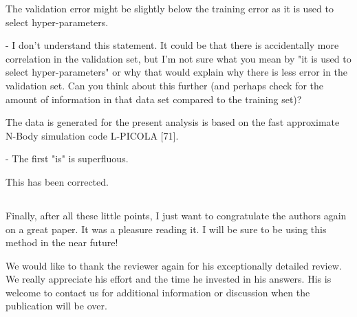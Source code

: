 \documentclass[12pt,a4paper]{article}
\newcommand{\nati}[1]{{\color[rgb]{.1,.6,.1}{NP: #1}}}
\newcommand{\1}{\b{1}}              %
\newcommand{\0}{\b{0}}              %
\begin{document}
\begin{mdframed}[style=comment]
The validation error might be slightly below the training error as it is used to select hyper-parameters.

- I don't understand this statement. It could be that there is accidentally more correlation in the validation set, but I'm not sure what you mean by "it is used to select hyper-parameters" or why that would explain why there is less error in the validation set. Can you think about this further (and perhaps check for the amount of information in that data set compared to the training set)?
\end{mdframed}
\nati{
We changed the sentence as:
\begin{mdframed}[style=manuscript]
The validation error might be slightly below the training error as the validation set is used to select hyper-parameters.
\end{mdframed}
For linear SVM, there is one hyper-parameter to tune. As we select the hyperparameter with the lowest validation error, it is possible that the validation error is lower than the training error.}

\begin{mdframed}[style=comment]
The data is generated for the present analysis is based on the fast approximate N-Body simulation code L-PICOLA [71].

- The first "is" is superfluous.
\end{mdframed}
This has been corrected.

\subsection{}

\begin{mdframed}[style=comment]

Finally, after all these little points, I just want to congratulate the authors again on a great paper. It was a pleasure reading it. I will be sure to be using this method in the near future!
\end{mdframed}
We would like to thank the reviewer again for his exceptionally detailed review. We really appreciate his effort and the time he invested in his answers. His is welcome to contact us for additional information or discussion when the publication will be over.



\clearpage
\newpage



\end{document}
